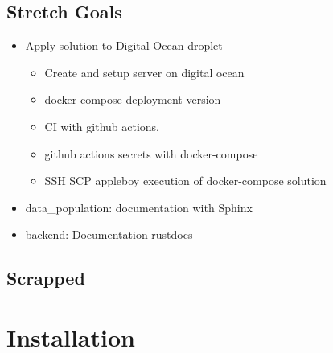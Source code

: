 \documentclass[a4paper, 12pt]{article}
\begin{document}
\subsection{Stretch Goals}
\begin{itemize}
	\item Apply solution to Digital Ocean droplet
	\begin{itemize}
		\item Create and setup server on digital ocean
		\item docker-compose deployment version
		\item CI with github actions.
		\item github actions secrets with docker-compose
		\item SSH SCP appleboy execution of docker-compose solution
	\end{itemize}
	\item data\_population: documentation with Sphinx
	\item backend: Documentation rustdocs 
	
\end{itemize}

\subsection{Scrapped}

\section{Installation}
\end{document}
